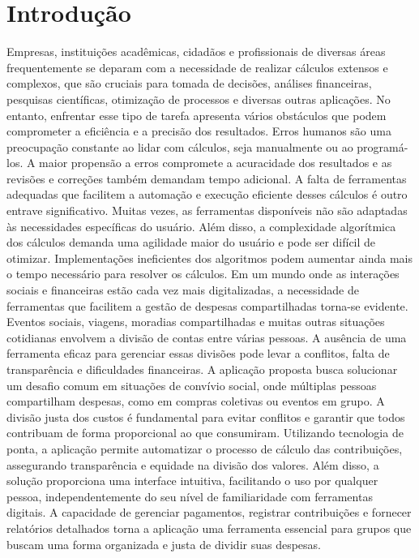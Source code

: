 \section{Introdução}

    Empresas, instituições acadêmicas, cidadãos e profissionais de diversas áreas frequentemente
se deparam com a necessidade de realizar cálculos extensos e complexos, que são cruciais para tomada
de decisões, análises financeiras, pesquisas científicas, otimização de processos e diversas outras
aplicações. No entanto, enfrentar esse tipo de tarefa apresenta vários obstáculos que podem
comprometer a eficiência e a precisão dos resultados.
    Erros humanos são uma preocupação constante ao lidar com cálculos, seja manualmente ou ao
programá-los. A maior propensão a erros compromete a acuracidade dos resultados e as revisões e
correções também demandam tempo adicional. A falta de ferramentas adequadas que facilitem a
automação e execução eficiente desses cálculos é outro entrave significativo. Muitas vezes, as
ferramentas disponíveis não são adaptadas às necessidades específicas do usuário.
    Além disso, a complexidade algorítmica dos cálculos demanda uma agilidade maior do
usuário e pode ser difícil de otimizar. Implementações ineficientes dos algoritmos podem aumentar
ainda mais o tempo necessário para resolver os cálculos.
    Em um mundo onde as interações sociais e financeiras estão cada vez mais digitalizadas, a
necessidade de ferramentas que facilitem a gestão de despesas compartilhadas torna-se evidente.
Eventos sociais, viagens, moradias compartilhadas e muitas outras situações cotidianas
envolvem a divisão de contas entre várias pessoas. A ausência de uma ferramenta eficaz para
gerenciar essas divisões pode levar a conflitos, falta de transparência e dificuldades
financeiras.
A aplicação proposta busca solucionar um desafio comum em situações de convívio social, onde múltiplas pessoas compartilham despesas, como em compras coletivas ou eventos em grupo. A divisão justa dos custos é fundamental para evitar conflitos e garantir que todos contribuam de forma proporcional ao que consumiram. Utilizando tecnologia de ponta, a aplicação permite automatizar o processo de cálculo das contribuições, assegurando transparência e equidade na divisão dos valores. Além disso, a solução proporciona uma interface intuitiva, facilitando o uso por qualquer pessoa, independentemente do seu nível de familiaridade com ferramentas digitais. A capacidade de gerenciar pagamentos, registrar contribuições e fornecer relatórios detalhados torna a aplicação uma ferramenta essencial para grupos que buscam uma forma organizada e justa de dividir suas despesas.